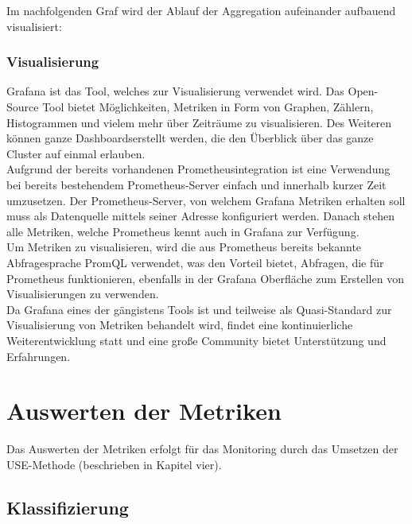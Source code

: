 \documentclass[a4paper,10pt]{scrartcl}
\begin{document}
Im nachfolgenden Graf wird der Ablauf der Aggregation aufeinander aufbauend visualisiert:

\begin{minipage}{\linewidth}
  \centering
  \scalebox{.8}{} 
\end{minipage}



\subsubsection{Visualisierung}

Grafana ist das Tool, welches zur Visualisierung verwendet wird. Das Open-Source Tool bietet Möglichkeiten, Metriken in Form von Graphen, Zählern, Histogrammen und vielem mehr über Zeiträume zu visualisieren. Des Weiteren können ganze \glqq Dashboards\grqq erstellt werden, die den Überblick über das ganze Cluster auf einmal erlauben.\\
Aufgrund der bereits vorhandenen Prometheusintegration ist eine Verwendung bei bereits bestehendem Prometheus-Server einfach und innerhalb kurzer Zeit umzusetzen.
Der Prometheus-Server, von welchem Grafana Metriken erhalten soll muss als Datenquelle mittels seiner Adresse konfiguriert werden. Danach stehen alle Metriken, welche Prometheus kennt auch in Grafana zur Verfügung.\\
Um Metriken zu visualisieren, wird die aus Prometheus bereits bekannte Abfragesprache PromQL verwendet, was den Vorteil bietet, Abfragen, die für Prometheus funktionieren, ebenfalls in der Grafana Oberfläche zum Erstellen von Visualisierungen zu verwenden.\\
Da Grafana eines der gängistens Tools ist und teilweise als Quasi-Standard zur Visualisierung von Metriken behandelt wird, findet eine kontinuierliche Weiterentwicklung statt und eine große Community bietet Unterstützung und Erfahrungen.\\%

\section{Auswerten der Metriken}

Das Auswerten der Metriken erfolgt für das Monitoring durch das Umsetzen der USE-Methode (beschrieben in Kapitel vier).

\subsection{Klassifizierung}
\end{document}
